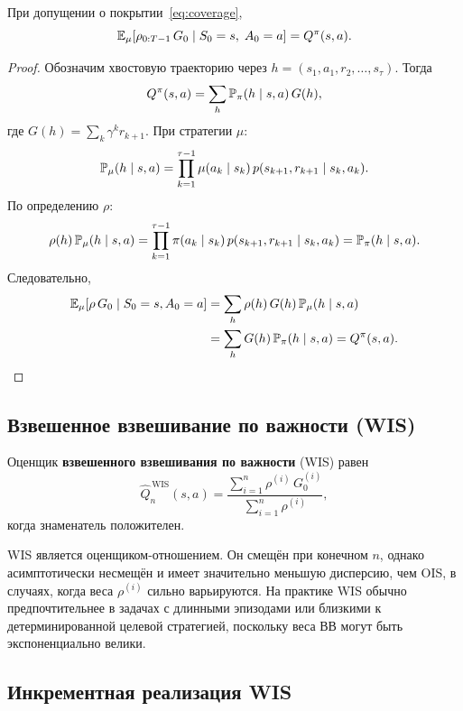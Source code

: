 \begin{theorem}
\label{thm:ois-unbiased}
При допущении о покрытии~\eqref{eq:coverage},
\[
  \operatorname{\mathbb{E}}_\mu\!\left[\rho_{0:T-1}\,G_0 \mid S_0 = s,\; A_0 = a\right] = Q^\pi(s, a).
\]
\end{theorem}

\begin{proof}
Обозначим хвостовую траекторию через $h = (s_1, a_1, r_2, \dots, s_\tau)$.  Тогда
\[
  Q^\pi(s, a) = \sum_{h} \mathbb{P}_\pi(h \mid s, a)\,G(h),
\]
где $G(h) = \sum_{k} \gamma^k r_{k+1}$.  При стратегии $\mu$:
\[
  \mathbb{P}_\mu(h \mid s, a) = \prod_{k=1}^{\tau-1} \mu(a_k \mid s_k)\,p(s_{k+1}, r_{k+1} \mid s_k, a_k).
\]
По определению $\rho$:
\[
  \rho(h)\,\mathbb{P}_\mu(h \mid s, a)
  = \prod_{k=1}^{\tau-1} \pi(a_k \mid s_k)\,p(s_{k+1}, r_{k+1} \mid s_k, a_k)
  = \mathbb{P}_\pi(h \mid s, a).
\]
Следовательно,
\begin{align*}
  \operatorname{\mathbb{E}}_\mu[\rho\,G_0 \mid S_0 = s, A_0 = a]
  &= \sum_h \rho(h)\,G(h)\,\mathbb{P}_\mu(h \mid s, a) \\
  &= \sum_h G(h)\,\mathbb{P}_\pi(h \mid s, a)
  = Q^\pi(s, a). \qedhere
\end{align*}
\end{proof}

\subsection*{Взвешенное взвешивание по важности (WIS)}

\begin{definition}
\label{def:wis}
Оценщик \textbf{взвешенного взвешивания по важности} (WIS) равен
\begin{equation}
  \label{eq:wis-estimator}
  \widehat{Q}_n^{\,\mathrm{WIS}}(s, a) = \frac{\sum_{i=1}^n \rho^{(i)}\,G_0^{(i)}}{\sum_{i=1}^n \rho^{(i)}},
\end{equation}
когда знаменатель положителен.
\end{definition}

WIS является оценщиком-отношением.  Он смещён при конечном $n$, однако асимптотически несмещён и имеет значительно меньшую дисперсию, чем OIS, в случаях, когда веса $\rho^{(i)}$ сильно варьируются.  На практике WIS обычно предпочтительнее в задачах с длинными эпизодами или близкими к детерминированной целевой стратегией, поскольку веса ВВ могут быть экспоненциально велики.

\subsection*{Инкрементная реализация WIS}

